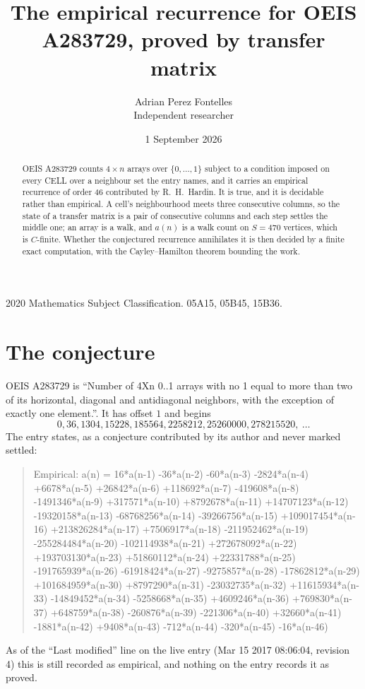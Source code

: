 \documentclass[11pt,a4paper]{article}
\title{The empirical recurrence for OEIS A283729, proved by transfer matrix}
\author{Adrian Perez Fontelles\\ \small Independent researcher}
\date{1 September 2026}
\theoremstyle{plain}
\theoremstyle{definition}
\begin{document}
\maketitle

\begin{abstract}
OEIS A283729 counts $4\times n$ arrays over $\{0,\dots,1\}$ subject to a condition imposed on
every CELL over a neighbour set the entry names, and it carries an empirical recurrence of
order $46$ contributed by R.~H.~Hardin. It is true, and it is decidable rather than
empirical. A cell's neighbourhood meets three consecutive columns, so the state of a transfer
matrix is a pair of consecutive columns and each step settles the middle one; an array is a
walk, and $a(n)$ is a walk count on $S=470$ vertices, which is $C$-finite. Whether the
conjectured recurrence annihilates it is then decided by a finite exact computation, with the
Cayley--Hamilton theorem bounding the work.
\end{abstract}

\noindent\small 2020 Mathematics Subject Classification. 05A15, 05B45, 15B36.\normalsize

\section{The conjecture}

OEIS A283729 is ``Number of 4Xn 0..1 arrays with no 1 equal to more than two of its horizontal, diagonal and antidiagonal neighbors, with the exception of exactly one element.''. It has offset $1$ and begins
\[
0, 36, 1304, 15228, 185564, 2258212, 25260000, 278215520,\ \dots
\]
The entry states, as a conjecture contributed by its author and never marked settled:
\begin{quote}
Empirical: a(n) = 16*a(n-1) -36*a(n-2) -60*a(n-3) -2824*a(n-4) +6678*a(n-5) +26842*a(n-6) +118692*a(n-7) -419608*a(n-8) -1491346*a(n-9) +317571*a(n-10) +8792678*a(n-11) +14707123*a(n-12) -19320158*a(n-13) -68768256*a(n-14) -39266756*a(n-15) +109017454*a(n-16) +213826284*a(n-17) +7506917*a(n-18) -211952462*a(n-19) -255284484*a(n-20) -102114938*a(n-21) +272678092*a(n-22) +193703130*a(n-23) +51860112*a(n-24) +22331788*a(n-25) -191765939*a(n-26) -61918424*a(n-27) -9275857*a(n-28) -17862812*a(n-29) +101684959*a(n-30) +8797290*a(n-31) -23032735*a(n-32) +11615934*a(n-33) -14849452*a(n-34) -5258668*a(n-35) +4609246*a(n-36) +769830*a(n-37) +648759*a(n-38) -260876*a(n-39) -221306*a(n-40) +32660*a(n-41) -1881*a(n-42) +9408*a(n-43) -712*a(n-44) -320*a(n-45) -16*a(n-46)
\end{quote}
As of the ``Last modified'' line on the live entry (Mar 15 2017 08:06:04, revision 4) this is still
recorded as empirical, and nothing on the entry records it as proved.
\end{document}
